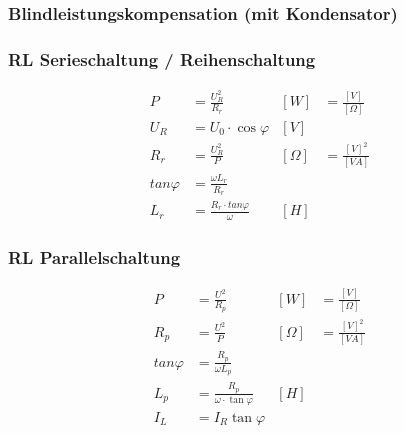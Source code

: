 		\subsubsection{Blindleistungskompensation (mit Kondensator)}
		
		\begin{multicols}{2}
			\subsubsection{RL Serieschaltung / Reihenschaltung}
				\begin{align*}
					P			&= \frac{U_R^2}{R_r}					& [W]		&= \frac{[V]}{[\Omega]}\\
					U_R			&= U_0 \cdot \cos\varphi				& [V]		& \\
					R_r			&= \frac{U_R^2}{P}						& [\Omega]	&= \frac{[V]^2}{[V A]} \\
					tan\varphi	&= \frac{\omega L_r}{R_r}				& 			& \\
					L_r			&= \frac{R_r \cdot tan\varphi}{\omega}	& [H]		&
				\end{align*}
			\columnbreak
			\subsubsection{RL Parallelschaltung}
				\begin{align*}
					P			&= \frac{U^2}{R_p}						& [W]		&= \frac{[V]}{[\Omega]}\\
					R_p			&= \frac{U^2}{P}						& [\Omega]	&= \frac{[V]^2}{[V A]} \\
					tan\varphi	&= \frac{R_p}{\omega L_p}				&			& \\
					L_p			&= \frac{R_p}{\omega \cdot \tan\varphi}	& [H]		& \\
					I_L			&= I_R \tan\varphi
				\end{align*}
		\end{multicols}

